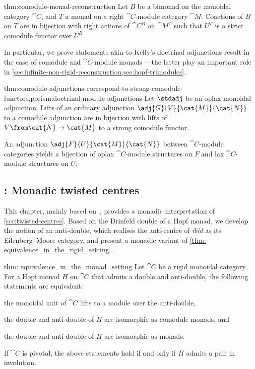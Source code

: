 \begin{reptheorem}{thm:comodule-monad-reconstruction}
  Let \(B\) be a bimonad on the monoidal category \(\cat{C}\),
  and \(T\) a monad on a right \(\cat{C}\)\hyp{}module category \(\cat{M}\).
  Coactions of \(B\) on \(T\) are
  in bijection with
  right actions of \(\cat{C}^B\) on \(\cat{M}^T\) such that \(U^{T}\) is a strict comodule functor over \(U^{B}\).
\end{reptheorem}

In particular, we prove statements akin to Kelly's doctrinal adjunctions result
in the case of comodule and \(\cat{C}\)\hyp{}module monads%
—the latter play an important role in \cref{sec:infinite-non-rigid-reconstruction,sec:hopf-trimodules}.

\begin{reptheorem}{thm:comodule-adjunctions-correspond-to-strong-comodule-functors,porism:doctrinal-module-adjunctions}
  Let \(\stdadj\) be an oplax monoidal adjunction.
  Lifts of an ordinary adjunction \(\adj{G}{V}{\cat{M}}{\cat{N}}\) to a comodule adjunction are
  in bijection with lifts of \(V \from \cat{N} \to \cat{M}\) to a strong comodule functor.

  An adjunction \(\adj{F}{U}{\cat{M}}{\cat{N}}\) between \(\cat{C}\)\hyp{}module categories
  yields a bijection of oplax \(\cat{C}\)\hyp{}module structures on \(F\)
  and lax \(\cat{C}\)\hyp{}module structures on \(U\).
\end{reptheorem}

\subsection*{: Monadic twisted centres}

This chapter,
mainly based on~\cite{halbig24:pivot-hopf},
provides a monadic interpretation of \cref{sec:twisted-centres}.
Based on the Drinfeld double of a Hopf monad, we develop the notion of an anti\hyp{}double,
which realises the anti\hyp{}centre of \emph{ibid} as its Eilenberg–Moore category,
and present a monadic variant of \cref{thm: equivalence_in_the_rigid_setting}.
\begin{reptheorem}{thm: equivalence_in_the_monad_setting}
  Let \(\cat{C}\) be a rigid monoidal category.
  For a Hopf monad \(H\) on \(\cat{C}\) that admits a double and anti\hyp{}double,
  the following statements are equivalent:
  \begin{thmlist}[noitemsep]
    \item the monoidal unit of \(\cat{C}\) lifts to a module over the anti-double,
    \item the double and anti\hyp{}double of \(H\) are isomorphic as comodule monads, and
    \item the double and anti\hyp{}double of \(H\) are isomorphic as monads.
  \end{thmlist}
  If \(\cat{C}\) is pivotal,
  the above statements hold if and only if \(H\) admits a pair in involution.
\end{reptheorem}

